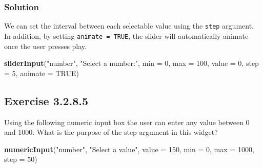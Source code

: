 \documentclass[]{book}
\newenvironment{Shaded}{\begin{snugshade}}{\end{snugshade}}
\newcommand{\DataTypeTok}[1]{\textcolor[rgb]{0.13,0.29,0.53}{#1}}
\newcommand{\DecValTok}[1]{\textcolor[rgb]{0.00,0.00,0.81}{#1}}
\newcommand{\KeywordTok}[1]{\textcolor[rgb]{0.13,0.29,0.53}{\textbf{#1}}}
\newcommand{\NormalTok}[1]{#1}
\newcommand{\OtherTok}[1]{\textcolor[rgb]{0.56,0.35,0.01}{#1}}
\newcommand{\StringTok}[1]{\textcolor[rgb]{0.31,0.60,0.02}{#1}}
\begin{document}
\begin{solution}

\hypertarget{solution-3}{%
\subsubsection*{Solution}\label{solution-3}}

We can set the interval between each selectable value using the \texttt{step}
argument. In addition, by setting \texttt{animate\ =\ TRUE}, the slider will
automatically animate once the user presses play.

\begin{Shaded}
\begin{Highlighting}[]
  \KeywordTok{sliderInput}\NormalTok{(}\StringTok{"number"}\NormalTok{, }\StringTok{"Select a number:"}\NormalTok{,}
              \DataTypeTok{min =} \DecValTok{0}\NormalTok{, }\DataTypeTok{max =} \DecValTok{100}\NormalTok{, }\DataTypeTok{value =} \DecValTok{0}\NormalTok{, }
              \DataTypeTok{step =} \DecValTok{5}\NormalTok{, }\DataTypeTok{animate =} \OtherTok{TRUE}\NormalTok{)}
\end{Highlighting}
\end{Shaded}

\end{solution}

\hypertarget{exercise-3.2.8.5}{%
\subsection*{Exercise 3.2.8.5}\label{exercise-3.2.8.5}}

Using the following numeric input box the user can enter any value between 0
and 1000. What is the purpose of the step argument in this widget?

\begin{Shaded}
\begin{Highlighting}[]
\KeywordTok{numericInput}\NormalTok{(}\StringTok{"number"}\NormalTok{, }\StringTok{"Select a value"}\NormalTok{, }\DataTypeTok{value =} \DecValTok{150}\NormalTok{, }\DataTypeTok{min =} \DecValTok{0}\NormalTok{, }\DataTypeTok{max =} \DecValTok{1000}\NormalTok{, }\DataTypeTok{step =} \DecValTok{50}\NormalTok{)}
\end{Highlighting}
\end{Shaded}
\end{document}
